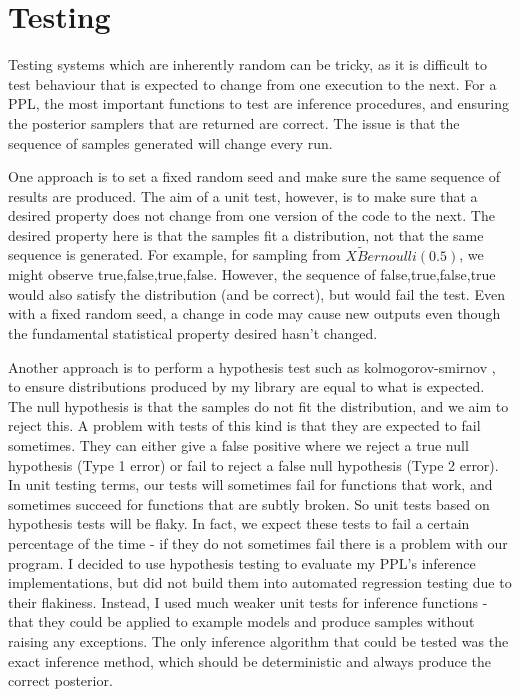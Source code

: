 	
\section{Testing}\label{sec:impl-testing}

Testing systems which are inherently random can be tricky, as it is difficult to test behaviour that is expected to change from one execution to the next. For a PPL, the most important functions to test are inference procedures, and ensuring the posterior samplers that are returned are correct. The issue is that the sequence of samples generated will change every run.

One approach is to set a fixed random seed and make sure the same sequence of results are produced. The aim of a unit test, however, is to make sure that a desired property does not change from one version of the code to the next. The desired property here is that the samples fit a distribution, not that the same sequence is generated. For example, for sampling from $X \tilde Bernoulli(0.5)$, we might observe true,false,true,false. However, the sequence of false,true,false,true would also satisfy the distribution (and be correct), but would fail the test. Even with a fixed random seed, a change in code may cause new outputs even though the fundamental statistical property desired hasn't changed.

Another approach is to perform a hypothesis test such as kolmogorov-smirnov \cite{massey1951kolmogorov}, to ensure distributions produced by my library are equal to what is expected. The null hypothesis is that the samples do not fit the distribution, and we aim to reject this. A problem with tests of this kind is that they are expected to fail sometimes. They can either give a false positive where we reject a true null hypothesis (Type 1 error) or fail to reject a false null hypothesis (Type 2 error). In unit testing terms, our tests will sometimes fail for functions that work, and sometimes succeed for functions that are subtly broken. So unit tests based on hypothesis tests will be flaky. In fact, we expect these tests to fail a certain percentage of the time - if they do not sometimes fail there is a problem with our program.
I decided to use hypothesis testing to evaluate my PPL's inference implementations, but did not build them into automated regression testing due to their flakiness. Instead, I used much weaker unit tests for inference functions - that they could be applied to example models and produce samples without raising any exceptions. The only inference algorithm that could be tested was the exact inference method, which should be deterministic and always produce the correct posterior.

